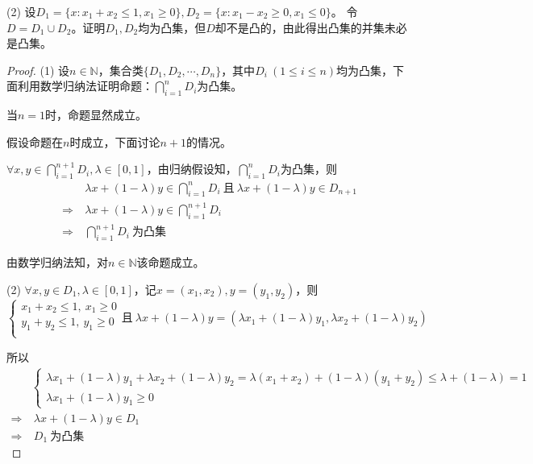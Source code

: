 \documentclass[12pt, a4paper, oneside]{ctexart}
\begin{document}
(2) 设$D_1=\{x:x_1+x_2\leqslant 1, x_1\geqslant 0\}, D_2=\{x:x_1-x_2\geqslant 0, x_1\leqslant 0\}$。
令$D=D_1\cup D_2$。证明$D_1,D_2$均为凸集，但$D$却不是凸的，由此得出凸集的并集未必是凸集。
\begin{proof}
    (1) 设$n\in \mathbb{N}$，集合类$\{D_1,D_2,\cdots, D_n\}$，其中$D_i\ (1\leqslant i\leqslant n)$均为凸集，下面利用数学归纳法证明命题：$\bigcap\limits_{i=1}^nD_i$为凸集。

    当$n=1$时，命题显然成立。

    假设命题在$n$时成立，下面讨论$n+1$的情况。
    
    $\forall x, y\in\bigcap\limits_{i=1}^{n+1}D_i, \lambda \in [0,1]$，由归纳假设知，$\bigcap\limits_{i=1}^nD_i$为凸集，则
    \begin{equation*}
        \begin{aligned}
            &\ \lambda x+(1-\lambda)y\in\bigcap_{i=1}^n D_i\ \text{且}\ \lambda x+(1-\lambda)y\in D_{n+1}\\
            \Rightarrow &\ \lambda x+(1-\lambda)y\in\bigcap_{i=1}^{n+1} D_i\\
            \Rightarrow &\ \bigcap_{i=1}^{n+1}D_i\ \text{为凸集}
        \end{aligned}
    \end{equation*}

    由数学归纳法知，对$n \in \mathbb{N}$该命题成立。

    (2) $\forall x, y\in D_1, \lambda\in[0, 1]$，记$x=(x_1,x_2), y=(y_1,y_2)$，则
    \begin{equation*}
        \begin{cases}
            x_1+x_2\leqslant 1,\ x_1\geqslant 0\\
            y_1+y_2\leqslant 1,\ y_1\geqslant 0\\
        \end{cases}
        \text{且}\ \lambda x + (1-\lambda) y = (\lambda x_1+(1-\lambda)y_1, \lambda x_2+(1-\lambda) y_2)
    \end{equation*}

    所以
    \begin{equation*}
        \begin{aligned}
            &\begin{cases}
                \lambda x_1+(1-\lambda)y_1+ \lambda x_2+(1-\lambda) y_2=\lambda(x_1+x_2)+(1-\lambda)(y_1+y_2)\leqslant \lambda+(1-\lambda) = 1\\
                \lambda x_1+(1-\lambda) y_1\geqslant 0
            \end{cases}\\
            \Rightarrow &\ \lambda x+(1-\lambda)y\in D_1\\
            \Rightarrow &\ D_1\ \text{为凸集}
        \end{aligned}
    \end{equation*}


\end{proof}
\end{document}
